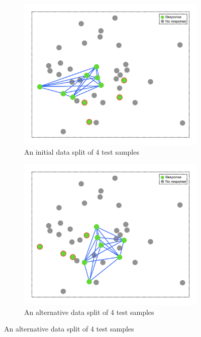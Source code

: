 \documentclass[12pt,a4paper]{report}
\begin{document}
\begin{figure}[h!]
    \centering

    \begin{subfigure}[b]{0.49\textwidth}
        \centering
        \includegraphics[width=\textwidth]{images/split_problem_1.png}
        \caption{An initial data split of 4 test samples}
        \label{fig:split_problem_1}
    \end{subfigure}
    \hfill
    \begin{subfigure}[b]{0.49\textwidth}
        \centering
        \includegraphics[width=\linewidth]{images/split_problem_2.png}
        \caption{An alternative data split of 4 test samples}
        \label{fig:split_problem_2}
    \end{subfigure}


\end{figure}
\end{document}

